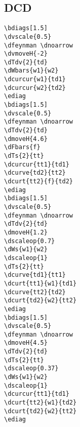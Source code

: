 \documentclass[a4paper]{article}
\begin{document}
\subsection{DCD}
\begin{minipage}[b]{0.5\linewidth}\centering
\begin{lstlisting}
\bdiags[1.5]
\dvscale{0.5}
\dfeynman \dnoarrow
\dvmoveH{-2}
\dTdv{2}{td}
\dWbars{w1}{w2}
\dcurcur{w1}{td1}
\dcurcur{w2}{td2}
\ediag
\bdiags[1.5]
\dvscale{0.5}
\dfeynman \dnoarrow
\dTdv{2}{td}
\dmoveH{4.6}
\dFbars{f}
\dTs{2}{tt}
\dcurcur{tt1}{td1}
\dcurve{td2}{tt2}
\dcurt{tt2}{f}{td2}
\ediag
\bdiags[1.5]
\dvscale{0.5}
\dfeynman \dnoarrow
\dTdv{2}{td}
\dmoveH{1.2}
\dscaleop{0.7}
\dWs{w1}{w2}
\dscaleop{1}
\dTs{2}{tt}
\dcurve{td1}{tt1}
\dcurt{tt1}{w1}{td1}
\dcurve{tt2}{td2}
\dcurt{td2}{w2}{tt2}
\ediag
\bdiags[1.5]
\dvscale{0.5}
\dfeynman \dnoarrow
\dmoveH{4.5}
\dTdv{2}{td}
\dTs{2}{tt}
\dscaleop{0.37}
\dWs{w1}{w2}
\dscaleop{1}
\dcurcur{tt1}{td1}
\dcurt{tt2}{w1}{td2}
\dcurt{td2}{w2}{tt2}
\ediag
\end{lstlisting}
\end{minipage}
\begin{minipage}[b]{0.5\linewidth}\centering
\bdiags[1.5]
\dfeynman \dnoarrow
{}
\ediag
\bdiags[1.5]
\dfeynman \dnoarrow
{}
\ediag
\bdiags[1.5]
\dfeynman \dnoarrow
{}
\ediag
\bdiags[1.5]
\dfeynman \dnoarrow
{}
\ediag
\end{minipage}
\end{document}
